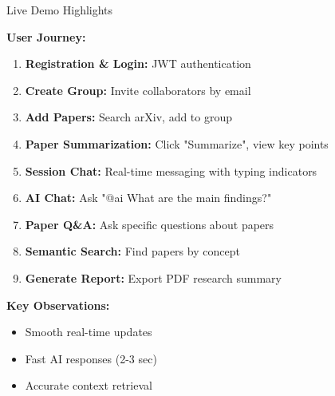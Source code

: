 \documentclass{beamer}
\begin{document}
\begin{frame}{Live Demo Highlights}

\textbf{User Journey:}

\begin{enumerate}
    \item \textbf{Registration \& Login:} JWT authentication
    \item \textbf{Create Group:} Invite collaborators by email
    \item \textbf{Add Papers:} Search arXiv, add to group
    \item \textbf{Paper Summarization:} Click "Summarize", view key points
    \item \textbf{Session Chat:} Real-time messaging with typing indicators
    \item \textbf{AI Chat:} Ask "@ai What are the main findings?"
    \item \textbf{Paper Q\&A:} Ask specific questions about papers
    \item \textbf{Semantic Search:} Find papers by concept
    \item \textbf{Generate Report:} Export PDF research summary
\end{enumerate}

\vspace{0.3cm}

\textbf{Key Observations:}
\begin{itemize}
    \item Smooth real-time updates
    \item Fast AI responses (2-3 sec)
    \item Accurate context retrieval
\end{itemize}

\end{frame}
\end{document}
